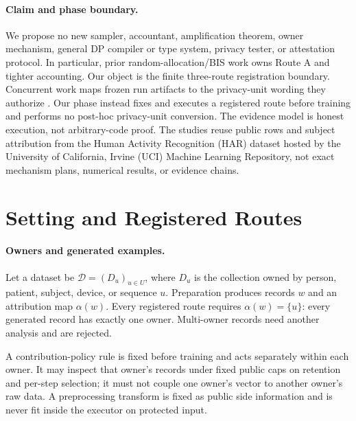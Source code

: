 \documentclass[letterpaper]{article}
\begin{document}
\paragraph{Claim and phase boundary.}
We propose no new sampler, accountant, amplification theorem, owner mechanism,
general DP compiler or type system, privacy tester, or attestation protocol.
In particular, prior random-allocation/BIS work owns Route A and tighter
accounting.  Our object is the finite three-route registration boundary.
Concurrent work maps frozen run artifacts to the privacy-unit wording they
authorize
\citep{anonymous2026audit}.  Our phase instead fixes and executes a registered
route before training and performs no post-hoc privacy-unit conversion.  The
evidence model is honest execution, not arbitrary-code proof.  The studies
reuse public rows and subject attribution from the Human Activity Recognition
(HAR) dataset hosted by the University of California, Irvine (UCI) Machine
Learning Repository, not exact mechanism plans, numerical results, or evidence
chains.

\section{Setting and Registered Routes}

\paragraph{Owners and generated examples.}
Let a dataset be $\mathcal D=(D_u)_{u\in U}$, where $D_u$ is the collection
owned by person, patient, subject, device, or sequence $u$.  Preparation
produces records $w$ and an attribution map $\alpha(w)$.  Every registered route
requires
$\alpha(w)=\{u\}$: every generated record has exactly one owner.  Multi-owner
records need another analysis \citep{ganesh2025multiattribution} and are
rejected.

A contribution-policy rule is fixed before training and acts separately
within each owner.  It may inspect that owner's records under fixed public caps
on retention and per-step selection; it must not couple one owner's vector to
another owner's raw data.  A preprocessing transform is fixed as public side
information and is never fit inside the executor on protected input.
\end{document}
